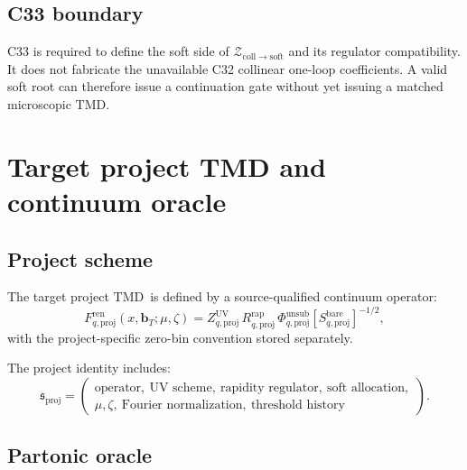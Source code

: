 \documentclass[11pt]{article}
\newcommand{\TMD}{\ensuremath{\mathrm{TMD}}}
\newcommand{\bT}{\bm b_T}
\newcommand{\cZ}{\mathcal Z}
\newcommand{\Coll}{\ensuremath{\mathrm{coll}}}
\newcommand{\Soft}{\ensuremath{\mathrm{soft}}}
\newcommand{\Proj}{\ensuremath{\mathrm{proj}}}
\newcommand{\Bare}{\ensuremath{\mathrm{bare}}}
\newcommand{\Ren}{\ensuremath{\mathrm{ren}}}
\newcommand{\Unsub}{\ensuremath{\mathrm{unsub}}}
\begin{document}
\subsection{C33 boundary}

C33 is required to define the soft side of \(\cZ_{\Coll\to\Soft}\) and its regulator compatibility.  It does not fabricate the unavailable C32 collinear one-loop coefficients.  A valid soft root can therefore issue a continuation gate without yet issuing a matched microscopic \TMD.

\section{Target project TMD and continuum oracle}
\label{sec:project-tmd}

\subsection{Project scheme}

The target project \TMD\ is defined by a source-qualified continuum operator:
\begin{equation}
 F_{q,\Proj}^{\Ren}
 (x,\bT;\mu,\zeta)
 =
 Z_{q,\Proj}^{\mathrm{UV}}\,
 R_{q,\Proj}^{\mathrm{rap}}\,
 \Phi_{q,\Proj}^{\Unsub}
 \left[S_{q,\Proj}^{\Bare}\right]^{-1/2},
 \label{eq:project-tmd}
\end{equation}
with the project-specific zero-bin convention stored separately.

The project identity includes:
\begin{equation}
 \mathfrak s_{\Proj}
 =
 \left(
 \begin{gathered}
 \text{operator},\ \text{UV scheme},\ \text{rapidity regulator},\ \text{soft allocation},\\
 \mu,\zeta,\ \text{Fourier normalization},\ \text{threshold history}
 \end{gathered}
 \right).
 \label{eq:project-scheme-id}
\end{equation}

\subsection{Partonic oracle}
\end{document}
